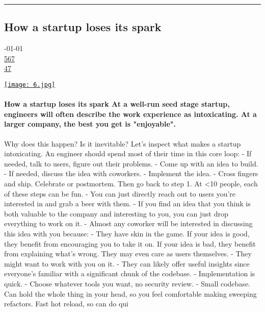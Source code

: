 \documentclass[10pt,a4paper]{article}
\begin{document}
\par\medskip
\noindent\textcolor{red}{\rule{\linewidth}{0.2mm}}

\subsection{How a startup loses its spark}
\noindent\begin{minipage}[t]{0.20\linewidth}
\vspace{0pt}
\noindent\textsc{\footnotesize
{\scriptsize\faCalendar}-01-01 \\
{\scriptsize\faThumbsOUp}\space 
\href{http://news.ycombinator.com/item?id=37098483\&utm\_term=comment}{567} \\
{\scriptsize\faComments}\space 
\href{http://news.ycombinator.com/item?id=37098483\&utm\_term=comment}{47} \\
}
\end{minipage} %
\begin{minipage}[t]{0.80\linewidth}
\vspace{0pt}
\begin{multicols}{2}

    \href{https://blog.johnqian.com/startup-spark?utm\_source=hackernewsletter\&utm\_medium=email\&utm\_term=fav}{
        \texttt{[image: 6.jpg]}
    }
  
\paragraph{How a startup loses its spark
At a well-run seed stage startup, engineers will often describe the work experience as intoxicating. At a larger company, the best you get is "enjoyable".}
 Why does this happen? Is it inevitable?
Let's inspect what makes a startup intoxicating. An engineer should spend most of their time in this core loop:
- If needed, talk to users, figure out their problems.
- Come up with an idea to build.
- If needed, discuss the idea with coworkers.
- Implement the idea.
- Cross fingers and ship. Celebrate or postmortem. Then go back to step 1.
At <10 people, each of these steps can be fun.
- You can just directly reach out to users you’re interested in and grab a beer with them.
- If you find an idea that you think is both valuable to the company and interesting to you, you can just drop everything to work on it.
- Almost any coworker will be interested in discussing this idea with you because:
- They have skin in the game. If your idea is good, they benefit from encouraging you to take it on. If your idea is bad, they benefit from explaining what’s wrong. They may even care as users themselves.
- They might want to work with you on it.
- They can likely offer useful insights since everyone’s familiar with a significant chunk of the codebase.
- Implementation is quick.
- Choose whatever tools you want, no security review.
- Small codebase. Can hold the whole thing in your head, so you feel comfortable making sweeping refactors. Fast hot reload, so can do qui

\end{multicols}
\end{minipage}
\end{document}
